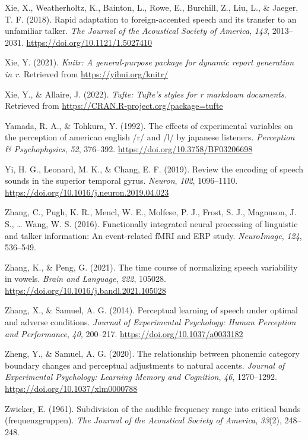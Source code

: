 \documentclass[
  11pt,
  man,floatsintext]{apa6}
\newlength{\cslhangindent}
\newlength{\cslentryspacingunit} %
\newenvironment{CSLReferences}[2] %
 {%
  \setlength{\parindent}{0pt}
  \ifodd #1
  \let\oldpar\par
  \def\par{\hangindent=\cslhangindent\oldpar}
  \fi
  \setlength{\parskip}{#2\cslentryspacingunit}
 }%
 {}
\begin{document}
\begin{CSLReferences}{1}{0}
\leavevmode{}%
Xie, X., Weatherholtz, K., Bainton, L., Rowe, E., Burchill, Z., Liu, L., \& Jaeger, T. F. (2018). Rapid adaptation to foreign-accented speech and its transfer to an unfamiliar talker. \emph{The Journal of the Acoustical Society of America}, \emph{143}, 2013--2031. \url{https://doi.org/10.1121/1.5027410}

\leavevmode{}%
Xie, Y. (2021). \emph{Knitr: A general-purpose package for dynamic report generation in r}. Retrieved from \url{https://yihui.org/knitr/}

\leavevmode{}%
Xie, Y., \& Allaire, J. (2022). \emph{Tufte: Tufte's styles for r markdown documents}. Retrieved from \url{https://CRAN.R-project.org/package=tufte}

\leavevmode{}%
Yamada, R. A., \& Tohkura, Y. (1992). The effects of experimental variables on the perception of american english /r/ and /l/ by japanese listeners. \emph{Perception \& Psychophysics}, \emph{52}, 376--392. \url{https://doi.org/10.3758/BF03206698}

\leavevmode{}%
Yi, H. G., Leonard, M. K., \& Chang, E. F. (2019). Review the encoding of speech sounds in the superior temporal gyrus. \emph{Neuron}, \emph{102}, 1096--1110. \url{https://doi.org/10.1016/j.neuron.2019.04.023}

\leavevmode{}%
Zhang, C., Pugh, K. R., Mencl, W. E., Molfese, P. J., Frost, S. J., Magnuson, J. S., \ldots{} Wang, W. S. (2016). Functionally integrated neural processing of linguistic and talker information: An event-related fMRI and ERP study. \emph{NeuroImage}, \emph{124}, 536--549.

\leavevmode{}%
Zhang, K., \& Peng, G. (2021). The time course of normalizing speech variability in vowels. \emph{Brain and Language}, \emph{222}, 105028. \url{https://doi.org/10.1016/j.bandl.2021.105028}

\leavevmode{}%
Zhang, X., \& Samuel, A. G. (2014). Perceptual learning of speech under optimal and adverse conditions. \emph{Journal of Experimental Psychology: Human Perception and Performance}, \emph{40}, 200--217. \url{https://doi.org/10.1037/a0033182}

\leavevmode{}%
Zheng, Y., \& Samuel, A. G. (2020). The relationship between phonemic category boundary changes and perceptual adjustments to natural accents. \emph{Journal of Experimental Psychology: Learning Memory and Cognition}, \emph{46}, 1270--1292. \url{https://doi.org/10.1037/xlm0000788}

\leavevmode{}%
Zwicker, E. (1961). Subdivision of the audible frequency range into critical bands (frequenzgruppen). \emph{The Journal of the Acoustical Society of America}, \emph{33}(2), 248--248.

\end{CSLReferences}
\end{document}
